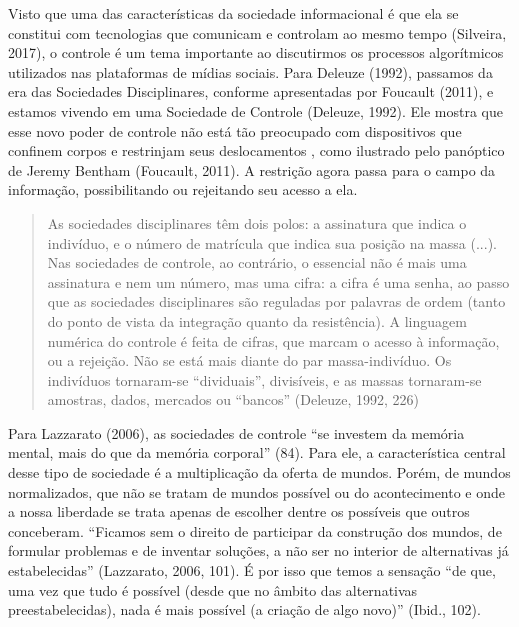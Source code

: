 Visto que uma das características da sociedade informacional é que ela
se constitui com tecnologias que comunicam e controlam ao mesmo tempo
(Silveira, 2017), o controle é um tema importante ao discutirmos os
processos algorítmicos utilizados nas plataformas de mídias sociais.
Para Deleuze (1992), passamos da era das Sociedades Disciplinares,
conforme apresentadas por Foucault
\protect\hypertarget{__Fieldmark__1368_1356454502}{}{}(\protect\hypertarget{__Fieldmark__468_193002426}{}{}2\protect\hypertarget{__Fieldmark__514_1743353457}{}{}011),
e estamos vivendo em uma Sociedade de Controle
\protect\hypertarget{__Fieldmark__1379_1356454502}{}{}(\protect\hypertarget{__Fieldmark__475_193002426}{}{}Deleuze,
1992). Ele mostra que esse novo poder de controle não está tão
preocupado com dispositivos que confinem corpos e restrinjam seus
deslocamentos , como ilustrado pelo panóptico de Jeremy Bentham
\protect\hypertarget{__Fieldmark__1401_1356454502}{}{}(Foucault, 2011).
A restrição agora passa para o campo da informação, possibilitando ou
rejeitando seu acesso a ela.

\begin{quote}
As sociedades disciplinares têm dois polos: a assinatura que indica o
indivíduo, e o número de matrícula que indica sua posição na massa
(...). Nas sociedades de controle, ao contrário, o essencial não é mais
uma assinatura e nem um número, mas uma cifra: a cifra é uma senha, ao
passo que as sociedades disciplinares são reguladas por palavras de
ordem (tanto do ponto de vista da integração quanto da resistência). A
linguagem numérica do controle é feita de cifras, que marcam o acesso à
informação, ou a rejeição. Não se está mais diante do par
massa-indivíduo. Os indivíduos tornaram-se ``dividuais'', divisíveis, e
as massas tornaram-se amostras, dados, mercados ou ``bancos'' (Deleuze,
1992, 226)
\end{quote}

Para Lazzarato
\protect\hypertarget{__Fieldmark__1427_1356454502}{}{}(\protect\hypertarget{__Fieldmark__529_193002426}{}{}2\protect\hypertarget{__Fieldmark__542_1743353457}{}{}0\protect\hypertarget{__Fieldmark__3574_70101425}{}{}0\protect\hypertarget{__Fieldmark__1673_1804063266}{}{}6),
as sociedades de controle ``se investem da memória mental, mais do que
da memória corporal'' (84). Para ele, a característica central desse
tipo de sociedade é a multiplicação da oferta de mundos. Porém, de
mundos normalizados, que não se tratam de mundos possível ou do
acontecimento e onde a nossa liberdade se trata apenas de escolher
dentre os possíveis que outros conceberam. ``Ficamos sem o direito de
participar da construção dos mundos, de formular problemas e de inventar
soluções, a não ser no interior de alternativas já estabelecidas''
\protect\hypertarget{__Fieldmark__1459_1356454502}{}{}(Lazzarato, 2006,
101)\protect\hypertarget{__Fieldmark__561_1743353457}{}{\protect\hypertarget{__Fieldmark__558_193002426}{}{}}.
É por isso que temos a sensação ``de que, uma vez que tudo é possível
(desde que no âmbito das alternativas preestabelecidas), nada é mais
possível (a criação de algo novo)'' (Ibid., 102).

